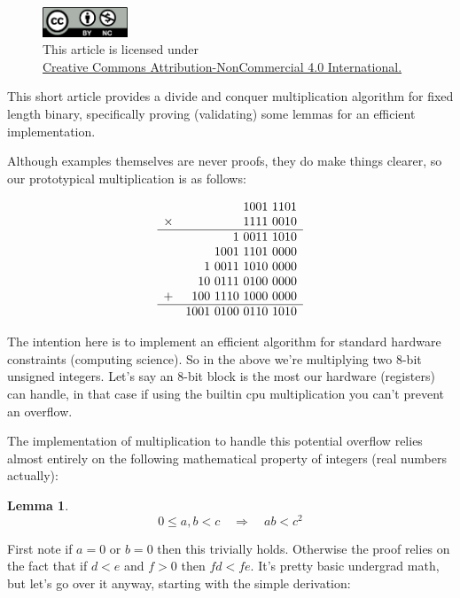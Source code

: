 \documentclass[twoside]{article}
\newtheorem{lemma}{Lemma}[section]
\begin{document}
\begin{figure}[h]
\centering
\includegraphics[width=1in]{cc-by-nc.png}\\[0.1in]
\tiny This article is licensed under \\
\href{http://creativecommons.org/licenses/by-nc/4.0/}
{Creative Commons Attribution-NonCommercial 4.0 International.}\\[0.3in]
\end{figure}

This short article provides a divide and conquer multiplication algorithm for fixed length binary,
specifically proving (validating) some lemmas for an efficient implementation.

Although examples themselves are never proofs, they do make things clearer, so our prototypical multiplication is as follows:

$$ \begin{array}{rr}
	& 1001\ 1101 \\
 \times & 1111\ 0010 \\\hline
	& 1\ 0011\ 1010 \\
	& 1001\ 1101\ 0000 \\
	& 1\ 0011\ 1010\ 0000 \\
	& 10\ 0111\ 0100\ 0000 \\
      + & 100\ 1110\ 1000\ 0000 \\\hline
	& 1001\ 0100\ 0110\ 1010
\end{array} $$

The intention here is to implement an efficient algorithm for standard hardware constraints (computing science).
So in the above we're multiplying two 8-bit unsigned integers. Let's say an 8-bit block is the most our hardware
(registers) can handle, in that case if using the builtin cpu multiplication you can't prevent an overflow.

The implementation of multiplication to handle this potential overflow relies almost entirely on the following
mathematical property of integers (real numbers actually):

\begin{lemma} $$ 0\leq a,b < c\quad\Longrightarrow\quad ab < c^2 $$
\end{lemma}

First note if $ a=0 $ or $ b=0 $ then this trivially holds. Otherwise the proof relies on the fact that
if $ d < e $ and $ f > 0 $ then $ fd < fe $. It's pretty basic undergrad math, but let's go over it anyway,
starting with the simple derivation:
\end{document}
